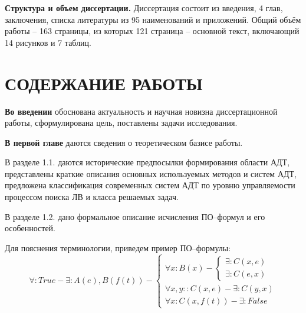 \documentclass[a4paper]{report}
\begin{document}

\textbf{Структура и объем диссертации.} Диссертация состоит из введения, 4 глав, заключения, списка литературы из 95 наименований и приложений. Общий объём работы -- 163 страницы, из которых 121 страница -- основной текст, включающий 14 рисунков и 7 таблиц.


\section*{СОДЕРЖАНИЕ РАБОТЫ}


\textbf{Во введении} обоснована актуальность и научная новизна диссертационной работы, сформулирована цель, поставлены задачи исследования.


\textbf{В первой главе} даются сведения о теоретическом базисе работы.

В разделе 1.1. даются исторические предпосылки формирования области АДТ, представлены краткие описания основных используемых методов и систем АДТ, предложена классификация современных систем АДТ по уровню управляемости процессом поиска ЛВ и класса решаемых задач.%

В разделе 1.2. дано формальное описание исчисления ПО--формул и его особенностей.

Для пояснения терминологии, приведем пример ПО--формулы:
$$
\forall\colon True - \exists\colon A(e),B(f(t)) - \left\{
\begin{array}{lcl}
 \forall x \colon B(x) - \left\{
     \begin{array}{lcl}
     \exists \colon C(x,e) \\
     \exists \colon C(e,x)
    \end{array}\right. \\
 \forall x,y \colon \colon C(x,e) - \exists\colon C(y,x) \\
 \forall x \colon C(x,f(t)) - \exists\colon False
\end{array}
\right.
$$
\end{document}
